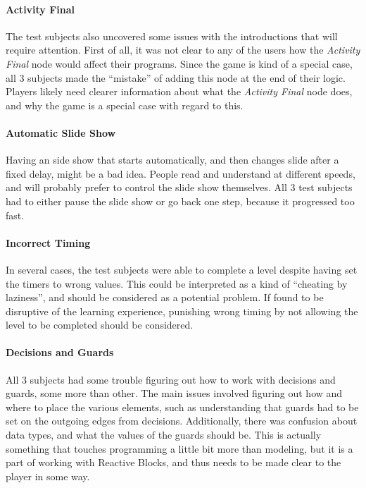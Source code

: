 \paragraph{Activity Final} The test subjects also uncovered some issues with the introductions that will require attention. First of all, it was not clear to any of the users how the \emph{Activity Final} node would affect their programs. Since the game is kind of a special case, all 3 subjects made the ``mistake'' of adding this node at the end of their logic. Players likely need clearer information about what the \emph{Activity Final} node does, and why the game is a special case with regard to this.

\paragraph{Automatic Slide Show} Having an side show that starts automatically, and then changes slide after a fixed delay, might be a bad idea. People read and understand at different speeds, and will probably prefer to control the slide show themselves. All 3 test subjects had to either pause the slide show or go back one step, because it progressed too fast.

\paragraph{Incorrect Timing} In several cases, the test subjects were able to complete a level despite having set the timers to wrong values. This could be interpreted as a kind of ``cheating by laziness'', and should be considered as a potential problem. If found to be disruptive of the learning experience, punishing wrong timing by not allowing the level to be completed should be considered.

\paragraph{Decisions and Guards} All 3 subjects had some trouble figuring out how to work with decisions and guards, some more than other. The main issues involved figuring out how and where to place the various elements, such as understanding that guards had to be set on the outgoing edges from decisions. Additionally, there was confusion about data types, and what the values of the guards should be. This is actually something that touches programming a little bit more than modeling, but it is a part of working with Reactive Blocks, and thus needs to be made clear to the player in some way.

